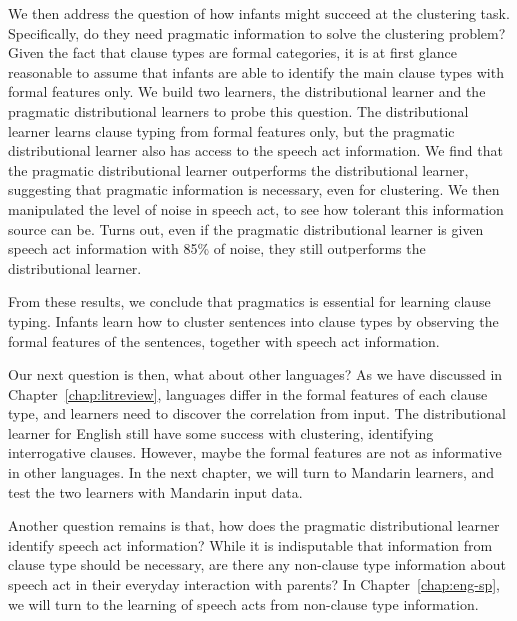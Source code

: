 We then address the question of how infants might succeed at the clustering task. Specifically, do they need pragmatic information to solve the clustering problem? Given the fact that clause types are formal categories, it is at first glance reasonable to assume that infants are able to identify the main clause types with formal features only. We build two learners, the distributional learner and the pragmatic distributional learners to probe this question. The distributional learner learns clause typing from formal features only, but the pragmatic distributional learner also has access to the speech act information. We find that the pragmatic distributional learner outperforms the distributional learner, suggesting that pragmatic information is necessary, even for clustering. We then manipulated the level of noise in speech act, to see how tolerant this information source can be. Turns out, even if the pragmatic distributional learner is given speech act information with 85\% of noise, they still outperforms the distributional learner. 

From these results, we conclude that pragmatics is essential for learning clause typing. Infants learn how to cluster sentences into clause types by observing the formal features of the sentences, together with speech act information.

Our next question is then, what about other languages? As we have discussed in Chapter~\ref{chap:litreview}, languages differ in the formal features of each clause type, and learners need to discover the correlation from input. The distributional learner for English still have some success with clustering, identifying interrogative clauses. However, maybe the formal features are not as informative in other languages. In the next chapter, we will turn to Mandarin learners, and test the two learners with Mandarin input data. 

Another question remains is that, how does the pragmatic distributional learner identify speech act information? While it is indisputable that information from clause type should be necessary, are there any non-clause type information about speech act in their everyday interaction with parents? In Chapter~\ref{chap:eng-sp}, we will turn to the learning of speech acts from non-clause type information.




